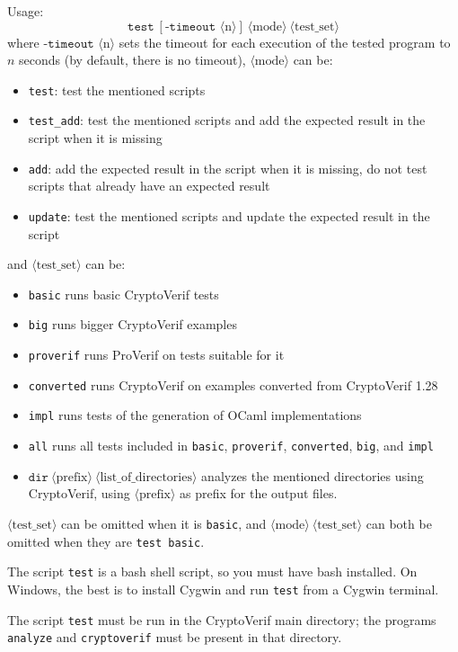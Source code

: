 \documentclass{article}
\newcommand{\nonterm}[1]{\langle\textrm{#1}\rangle}
\begin{document}
Usage: 
\[\mathtt{test}\ [\texttt{-timeout }\nonterm{n}]\ \nonterm{mode}\ \nonterm{test\_set}\]
where
$\texttt{-timeout }\nonterm{n}$ sets the timeout for each execution of the tested
program to $n$ seconds (by default, there is no timeout),
$\nonterm{mode}$ can be:
\begin{itemize}
\item \texttt{test}: test the mentioned scripts
\item \texttt{test\_add}: test the mentioned scripts and add the 
expected result in the script when it is missing
\item \texttt{add}: add the expected result in the script when it is missing, 
do not test scripts that already have an expected result
\item \texttt{update}: test the mentioned scripts and update the expected
result in the script
\end{itemize}
and $\nonterm{test\_set}$ can be:
\begin{itemize}
\item \texttt{basic} runs basic CryptoVerif tests
\item \texttt{big} runs bigger CryptoVerif examples
\item \texttt{proverif} runs ProVerif on tests suitable for it
\item \texttt{converted} runs CryptoVerif on examples converted from CryptoVerif 1.28
\item \texttt{impl} runs tests of the generation of OCaml implementations
\item \texttt{all} runs all tests included in \texttt{basic}, \texttt{proverif}, \texttt{converted}, \texttt{big}, and \texttt{impl}
\item $\texttt{dir}\ \nonterm{prefix}\ \nonterm{list\_of\_directories}$ analyzes the mentioned directories
using CryptoVerif, using $\nonterm{prefix}$ as prefix for the output files.
\end{itemize}
$\nonterm{test\_set}$ can be omitted when it is \texttt{basic},
and $\nonterm{mode}\ \nonterm{test\_set}$ can both be omitted when they are
\texttt{test\ basic}.

The script \texttt{test} is a bash shell script, so you must have bash
installed. On Windows, the best is to install Cygwin and run \texttt{test}
from a Cygwin terminal.

The script \texttt{test} must be run in the CryptoVerif main directory;
the programs \texttt{analyze} and \texttt{cryptoverif}
must be present in that directory.
\end{document}
